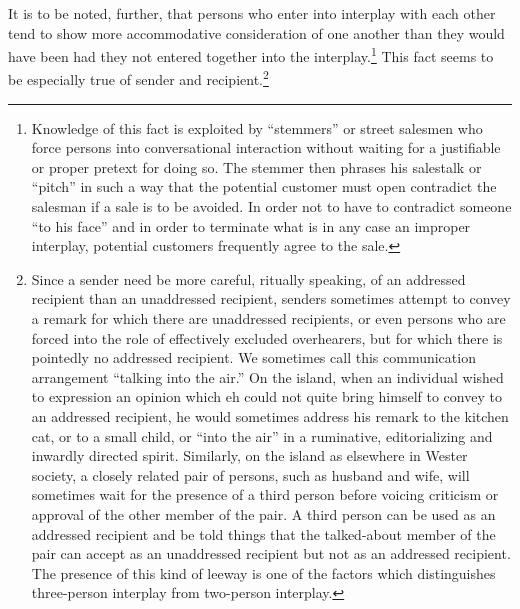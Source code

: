\documentclass[openany,nobib]{tufte-book}
\begin{document}
It is to be noted, further, that persons who enter into interplay with
each other tend to show more accommodative consideration of one another
than they would have been had they not entered together into the
interplay.\footnote{Knowledge of this fact is exploited by ``stemmers''
  or street salesmen who force persons into conversational interaction
  without waiting for a justifiable or proper pretext for doing so. The
  stemmer then phrases his salestalk or ``pitch'' in such a way that the
  potential customer must open contradict the salesman if a sale is to
  be avoided. In order not to have to contradict someone ``to his face''
  and in order to terminate what is in any case an improper interplay,
  potential customers frequently agree to the sale.} This fact seems to
be especially true of sender and recipient.\footnote{Since a sender
  need be more careful, ritually speaking, of an addressed recipient
  than an unaddressed recipient, senders sometimes attempt to convey a
  remark for which there are unaddressed recipients, or even persons who
  are forced into the role of effectively excluded overhearers, but for
  which there is pointedly no addressed recipient. We sometimes call
  this communication arrangement ``talking into the air.'' On the
  island, when an individual wished to expression an opinion which eh
  could not quite bring himself to convey to an addressed recipient, he
  would sometimes address his remark to the kitchen cat, or to a small
  child, or ``into the air'' in a ruminative, editorializing and
  inwardly directed spirit. Similarly, on the island as elsewhere in
  Wester society, a closely related pair of persons, such as husband and
  wife, will sometimes wait for the presence of a third person before
  voicing criticism or approval of the other member of the pair. A third
  person can be used as an addressed recipient and be told things that
  the talked-about member of the pair can accept as an unaddressed
  recipient but not as an addressed recipient. The presence of this kind
  of leeway is one of the factors which distinguishes three-person
  interplay from two-person interplay.}
\end{document}

